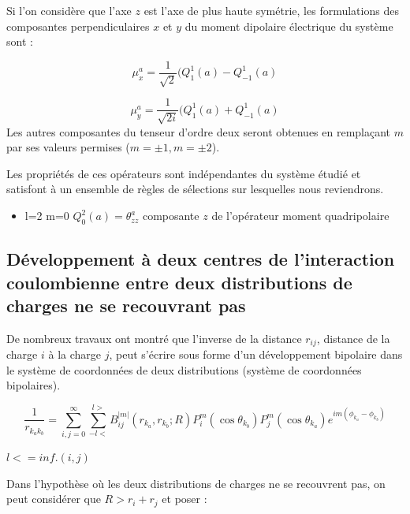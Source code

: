 	Si l'on considère que l'axe $z$ est l'axe de plus haute symétrie, les formulations des composantes perpendiculaires $x$ et $y$ du moment dipolaire électrique du système sont : 
	
	\begin{equation}
	\mu_{x}^{a} = \frac{1}{\sqrt{2}} (Q_{1}^{1}(a)- Q_{-1}^{1}(a)
	\end{equation}
	
	\begin{equation}
	\mu_{y}^{a} = \frac{1}{\sqrt{2i}} (Q_{1}^{1}(a)+ Q_{-1}^{1}(a)
	\end{equation}
	Les autres composantes du tenseur d'ordre deux seront obtenues en remplaçant $m$ par ses valeurs permises ($m=\pm 1, m=\pm 2$).
	
	Les propriétés de ces opérateurs sont indépendantes du système étudié et satisfont à un ensemble de règles de sélections sur lesquelles nous reviendrons. 
	
	\begin{itemize}
		\item l=2 m=0 \hspace{1cm} $Q_{0}^{2}(a) = \theta_{zz}^{a}$ \hspace{1cm} composante $z$ de l'opérateur moment quadripolaire 
	\end{itemize}
	
	
	\subsection{Développement à deux centres de l'interaction coulombienne entre deux distributions de charges ne se recouvrant pas}
	
	De nombreux travaux \cite{buehler1951bipolar,hylleraas1931elektronenterme,proctor1977long,davison1968atomic} ont montré que l'inverse de la distance $r_{ij}$, distance de la charge $i$ à la charge $j$, peut s'écrire sous forme d'un développement bipolaire dans le système de coordonnées de deux distributions (système de coordonnées bipolaires).
	
	\begin{equation}
	\frac{1}{r_{k_{a}k_{b}}} = \sum_{i,j=0}^{\infty} \sum_{-l<}^{l>} B_{ij}^{|m|}(r_{k_{a}}, r_{k_{b}}; R) P_{i}^{m} (\cos\theta_{k_{b}}) P_{j}^{m}(\cos\theta_{k_{a}}) e^{im(\phi_{k_{a}}-\phi_{k_{b}})}
	\end{equation}
	
	$l< = inf.(i,j)$
	
	
	Dans l'hypothèse où les deux distributions de charges ne se recouvrent pas, on peut considérer que $R> r_{i} +r_{j}$ et poser : 
	
